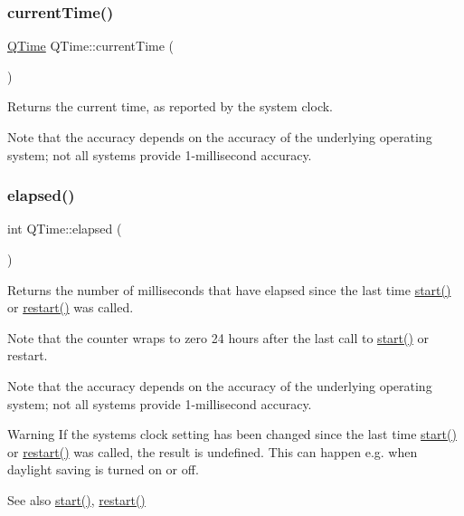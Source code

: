 \subsubsection{\texorpdfstring{currentTime()}{currentTime()}}
{\footnotesize\ttfamily \mbox{\hyperlink{class_q_time}{Q\+Time}} Q\+Time\+::current\+Time (\begin{DoxyParamCaption}{ }\end{DoxyParamCaption})\hspace{0.3cm}{\ttfamily [static]}}

Returns the current time, as reported by the system clock.

Note that the accuracy depends on the accuracy of the underlying operating system; not all systems provide 1-\/millisecond accuracy. \mbox{\label{class_q_time_ae6223ec2c678edc4c0b4e8b4d51091c8}} 
\subsubsection{\texorpdfstring{elapsed()}{elapsed()}}
{\footnotesize\ttfamily int Q\+Time\+::elapsed (\begin{DoxyParamCaption}{ }\end{DoxyParamCaption})}

Returns the number of milliseconds that have elapsed since the last time \mbox{\hyperlink{class_q_time_aafacb3c8da8d383b7e688f6df20c8835}{start()}} or \mbox{\hyperlink{class_q_time_ae4031d9d548cfa663c03d64ac6eb32f6}{restart()}} was called.

Note that the counter wraps to zero 24 hours after the last call to \mbox{\hyperlink{class_q_time_aafacb3c8da8d383b7e688f6df20c8835}{start()}} or restart.

Note that the accuracy depends on the accuracy of the underlying operating system; not all systems provide 1-\/millisecond accuracy.

\begin{DoxyWarning}{Warning}
If the system\textquotesingle{}s clock setting has been changed since the last time \mbox{\hyperlink{class_q_time_aafacb3c8da8d383b7e688f6df20c8835}{start()}} or \mbox{\hyperlink{class_q_time_ae4031d9d548cfa663c03d64ac6eb32f6}{restart()}} was called, the result is undefined. This can happen e.\+g. when daylight saving is turned on or off.
\end{DoxyWarning}
\begin{DoxySeeAlso}{See also}
\mbox{\hyperlink{class_q_time_aafacb3c8da8d383b7e688f6df20c8835}{start()}}, \mbox{\hyperlink{class_q_time_ae4031d9d548cfa663c03d64ac6eb32f6}{restart()}} 
\end{DoxySeeAlso}
\mbox{\label{class_q_time_a228b4c7467705db31821dadd5ec9101b}} 
